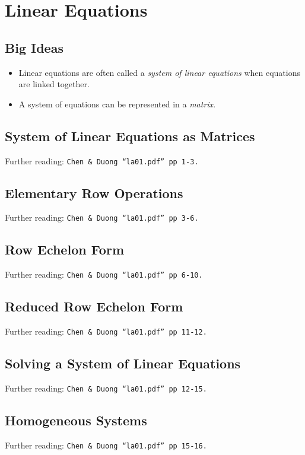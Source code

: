 \chapter{Linear Equations}
\label{chap:LE}

\section{Big Ideas}
\label{sec:LE Big Ideas}
\begin{itemize}
  \item Linear equations are often called a \emph{system of linear equations}
  when equations are linked together.
  \item A system of equations can be represented in a \emph{matrix}.
\end{itemize}

\section{System of Linear Equations as Matrices}
\label{sec:LE System of Linear Equations as Matrices}
Further reading: \texttt{Chen \& Duong ``la01.pdf'' pp 1-3.}

\section{Elementary Row Operations}
\label{sec:LE Elementary Row Operations}
Further reading: \texttt{Chen \& Duong ``la01.pdf'' pp 3-6.}

\section{Row Echelon Form}
\label{sec:LE Row Echelon Form}
Further reading: \texttt{Chen \& Duong ``la01.pdf'' pp 6-10.}

\section{Reduced Row Echelon Form}
\label{sec:LE Reduced Row Echelon Form}
Further reading: \texttt{Chen \& Duong ``la01.pdf'' pp 11-12.}

\section{Solving a System of Linear Equations}
\label{sec:LE Solving a System of Linear Equations}
Further reading: \texttt{Chen \& Duong ``la01.pdf'' pp 12-15.}

\section{Homogeneous Systems}
\label{sec:LE Homogeneous Systems}
Further reading: \texttt{Chen \& Duong ``la01.pdf'' pp 15-16.}